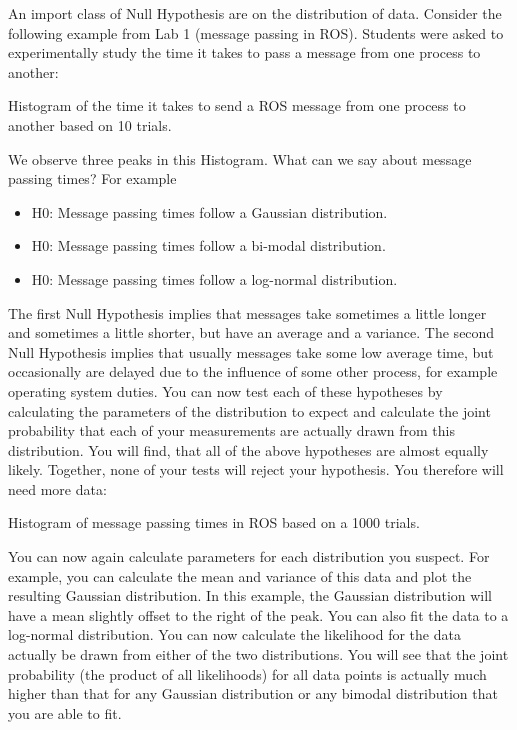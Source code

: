 An import class of Null Hypothesis are on the distribution of data. Consider the following example from Lab 1 (message passing in ROS). Students were asked to experimentally study the time it takes to pass a message from one process to another:

\begin{framed}
Histogram of the time it takes to send a ROS message from one process to another based on 10 trials.
\end{framed}

We observe three peaks in this Histogram. What can we say about message passing times? For example
\begin{itemize}
\item H0: Message passing times follow a Gaussian distribution.
\item H0: Message passing times follow a bi-modal distribution.
\item H0: Message passing times follow a log-normal distribution.
\end{itemize}

The first Null Hypothesis implies that messages take sometimes a little longer and sometimes a little shorter, but have an average and a variance. The second Null Hypothesis implies that usually messages take some low average time, but occasionally are delayed due to the influence of some other process, for example operating system duties. You can now test each of these hypotheses by calculating the parameters of the distribution to expect and calculate the joint probability that each of your measurements are actually drawn from this distribution. You will find, that all of the above hypotheses are almost equally likely. Together, none of your tests will reject your hypothesis. You therefore will need more data:

\begin{framed}
Histogram of message passing times in ROS based on a 1000 trials.
\end{framed}

You can now again calculate parameters for each distribution you suspect. For example, you can calculate the mean and variance of this data and plot the resulting Gaussian distribution. In this example, the Gaussian distribution will have a mean slightly offset to the right of the peak. You can also fit the data to a log-normal distribution. You can now calculate the likelihood for the data actually be drawn from either of the two distributions. You will see that the joint probability (the product of all likelihoods) for all data points is actually much higher than that for any Gaussian distribution or any bimodal distribution that you are able to fit.

